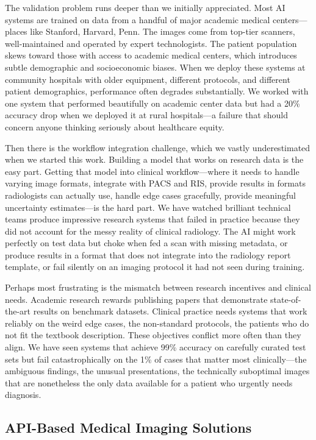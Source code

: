 \documentclass[12pt,a4paper]{article}
\begin{document}
The validation problem runs deeper than we initially appreciated. Most AI systems are trained on data from a handful of major academic medical centers—places like Stanford, Harvard, Penn. The images come from top-tier scanners, well-maintained and operated by expert technologists. The patient population skews toward those with access to academic medical centers, which introduces subtle demographic and socioeconomic biases. When we deploy these systems at community hospitals with older equipment, different protocols, and different patient demographics, performance often degrades substantially. We worked with one system that performed beautifully on academic center data but had a 20\% accuracy drop when we deployed it at rural hospitals—a failure that should concern anyone thinking seriously about healthcare equity.

Then there is the workflow integration challenge, which we vastly underestimated when we started this work. Building a model that works on research data is the easy part. Getting that model into clinical workflow—where it needs to handle varying image formats, integrate with PACS and RIS, provide results in formats radiologists can actually use, handle edge cases gracefully, provide meaningful uncertainty estimates—is the hard part. We have watched brilliant technical teams produce impressive research systems that failed in practice because they did not account for the messy reality of clinical radiology. The AI might work perfectly on test data but choke when fed a scan with missing metadata, or produce results in a format that does not integrate into the radiology report template, or fail silently on an imaging protocol it had not seen during training.

Perhaps most frustrating is the mismatch between research incentives and clinical needs. Academic research rewards publishing papers that demonstrate state-of-the-art results on benchmark datasets. Clinical practice needs systems that work reliably on the weird edge cases, the non-standard protocols, the patients who do not fit the textbook description. These objectives conflict more often than they align. We have seen systems that achieve 99\% accuracy on carefully curated test sets but fail catastrophically on the 1\% of cases that matter most clinically—the ambiguous findings, the unusual presentations, the technically suboptimal images that are nonetheless the only data available for a patient who urgently needs diagnosis.

\subsection{API-Based Medical Imaging Solutions}
\end{document}
